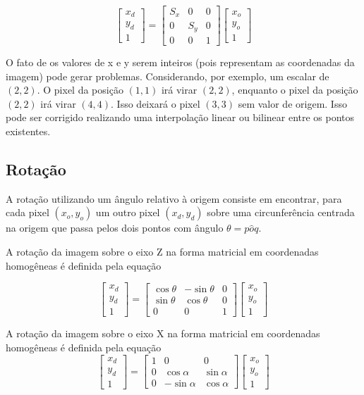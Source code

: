 \documentclass[12pt,oneside,a4paper,english,french,spanish,brazil,]{abntex2}
\begin{document}
\[
\begin{bmatrix}
x_d\\ 
y_d\\ 
1
\end{bmatrix}
=
\begin{bmatrix}
S_x & 0 & 0\\ 
0 & S_y & 0\\ 
0 & 0 & 1
\end{bmatrix}
\begin{bmatrix}
x_o\\ 
y_o\\ 
1
\end{bmatrix}
\]

O fato de os valores de x e y serem inteiros (pois representam as coordenadas da imagem) pode gerar problemas. Considerando, por exemplo, um escalar de \((2,2)\). O pixel da posição \((1,1)\) irá virar \((2,2)\), enquanto o pixel da posição \((2,2)\) irá virar \((4,4)\). Isso deixará o pixel \((3,3)\) sem valor de origem. Isso pode ser corrigido realizando uma interpolação linear ou bilinear entre os pontos existentes.

\subsection{Rotação}

A rotação utilizando um ângulo  relativo à origem consiste em encontrar, para cada pixel \((x_o,y_o)\) um outro pixel \((x_d,y_d)\) sobre uma circunferência centrada na origem que passa pelos dois pontos com ângulo \(\theta=p \hat{o} q\). 

A rotação da imagem sobre o eixo Z na forma matricial em coordenadas homogêneas é definida pela equação

\[
\begin{bmatrix}
x_d\\ 
y_d\\ 
1
\end{bmatrix}
=
\begin{bmatrix}
\cos{\theta} & -\sin{\theta} & 0\\ 
\sin{\theta} & \cos{\theta} & 0\\ 
0 & 0 & 1
\end{bmatrix}
\begin{bmatrix}
x_o\\ 
y_o\\ 
1
\end{bmatrix}
\]

A rotação da imagem sobre o eixo X na forma matricial em coordenadas homogêneas é definida pela equação
\[
\begin{bmatrix}
x_d\\ 
y_d\\ 
1
\end{bmatrix}
=
\begin{bmatrix}
1 & 0 & 0\\ 
0 & \cos{\alpha } & \sin{\alpha }\\ 
0 & -\sin{\alpha } & \cos{\alpha }
\end{bmatrix}
\begin{bmatrix}
x_o\\ 
y_o\\ 
1
\end{bmatrix}
\]
\end{document}
